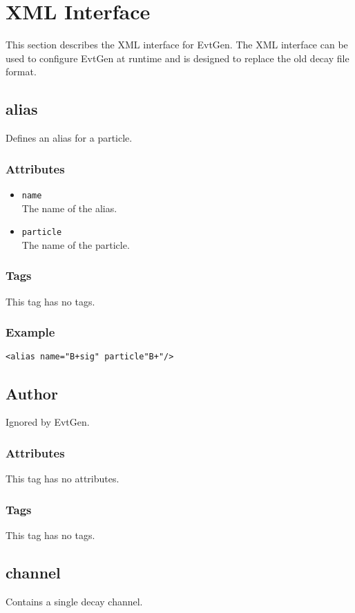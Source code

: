 \section{XML Interface}
\label{sec:xml}
This section describes the XML interface for EvtGen. The XML interface can be used to configure EvtGen at runtime and is designed to replace the old decay file format.

\subsection{alias}
Defines an alias for a particle.
\subsubsection*{Attributes}
\begin{itemize}
\item{\tt name}\\
      The name of the alias.
\item{\tt particle}\\
      The name of the particle.
\end{itemize}
\subsubsection*{Tags}
This tag has no tags.
\subsubsection*{Example}
{\footnotesize
\begin{verbatim}
<alias name="B+sig" particle"B+"/>
\end{verbatim}
}

\subsection{Author}
Ignored by EvtGen.
\subsubsection*{Attributes}
This tag has no attributes.
\subsubsection*{Tags}
This tag has no tags.

\subsection{channel}
Contains a single decay channel.
